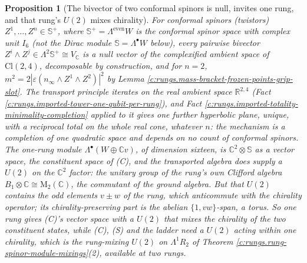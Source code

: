 \documentclass[11pt]{article}
\newtheorem{proposition}[theorem]{Proposition}
\theoremstyle{definition}
\theoremstyle{plain}
\providecommand{\C}{}\renewcommand{\C}{\mathbb{C}}
\providecommand{\CS}{}\renewcommand{\CS}{{\mathbb{S}^{+}}}
\providecommand{\Cl}{}\renewcommand{\Cl}{\mathrm{Cl}}
\providecommand{\R}{}\renewcommand{\R}{\mathbb{R}}
\providecommand{\Sp}{}\renewcommand{\Sp}{\mathbb{S}}
\begin{document}
\begin{proposition}[The bivector of two conformal spinors is null, invites one rung, and that rung's $U(2)$ mixes chirality]\label{c:rungs.two-twistor-bivector-null-invites-one}
For conformal spinors (twistors) $Z^{1}, \ldots, Z^{n} \in \CS$, where $\CS = \Lambda^{\mathrm{even}}W$ is the conformal spinor space with complex unit $I_6$ (not the Dirac module $\Sp = \Lambda^{\bullet}W$ below), every pairwise bivector $Z^{i} \wedge Z^{j} \in \Lambda^{2}\CS \cong V_{\C}$ is a null vector of the complexified ambient space of $\Cl(2,4)$, decomposable by construction, and for $n = 2$, $m^{2} = 2|\varepsilon(n_{\infty} \wedge Z^{1}\wedge Z^{2})|^{2}$ by Lemma \ref{c:rungs.mass-bracket-frozen-points-grip-slot}. The transport principle iterates on the real ambient space $\R^{2,4}$ (Fact \ref{c:rungs.imported-tower-one-qubit-per-rung}), and Fact \ref{c:rungs.imported-totality-minimality-completion} applied to it gives one further hyperbolic plane, unique, with a reciprocal total on the whole real cone, whatever $n$: the mechanism is a completion of one quadratic space and depends on no count of conformal spinors. The one-rung module $\Lambda^{\bullet}(W \oplus \C v)$, of dimension sixteen, is $\C^{2} \otimes \Sp$ as a vector space, the constituent space of (C), and the transported algebra does supply a $U(2)$ on the $\C^{2}$ factor: the unitary group of the rung's own Clifford algebra $B_{1} \otimes \C \cong \mathrm{M}_{2}(\C)$, the commutant of the ground algebra. But that $U(2)$ contains the odd elements $v \pm w$ of the rung, which anticommute with the chirality operator; its chirality-preserving part is the abelian $\{1, vw\}$-span, a torus. So one rung gives (C)'s vector space with a $U(2)$ that mixes the chirality of the two constituent states, while (C), (S) and the ladder need a $U(2)$ acting within one chirality, which is the rung-mixing $U(2)$ on $\Lambda^{1}R_{2}$ of Theorem \ref{c:rungs.rung-spinor-module-mixings}(2), available at two rungs.
\end{proposition}
\end{document}

